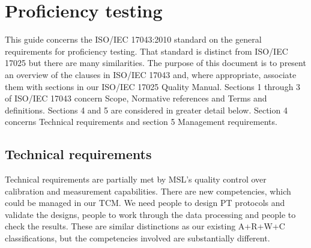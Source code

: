 \section{Proficiency testing}
This guide concerns the ISO/IEC 17043:2010 standard on the general requirements for proficiency testing. That standard is distinct from ISO/IEC 17025 but there are many similarities. The purpose of this document is to present an overview of the clauses in ISO/IEC 17043 and, where appropriate, associate them with sections in our ISO/IEC 17025 Quality Manual. 
Sections 1 through 3 of ISO/IEC 17043 concern Scope, Normative references and Terms and definitions. Sections 4 and 5 are considered in greater detail below. Section 4 concerns Technical requirements and section 5 Management requirements.

\subsection{Technical requirements}

Technical requirements are partially met by MSL's quality control over calibration and measurement capabilities. There are new competencies, which could be managed in our TCM. We need people to design PT protocols and validate the designs, people to work through the data processing and people to check the results. These are similar distinctions as our existing A+R+W+C classifications, but the competencies involved are substantially different.

